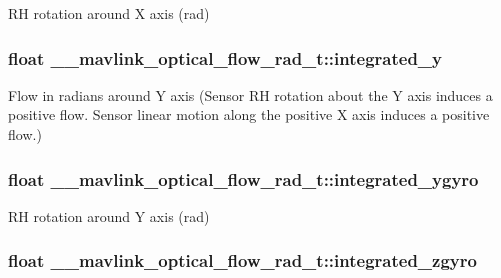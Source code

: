 R\+H rotation around X axis (rad) 

\hypertarget{struct____mavlink__optical__flow__rad__t_acc14c952d5780461cf91a5d4a7fedc89}{
\subsubsection[{integrated\+\_\+y}]{\setlength{\rightskip}{0pt plus 5cm}float \+\_\+\+\_\+mavlink\+\_\+optical\+\_\+flow\+\_\+rad\+\_\+t\+::integrated\+\_\+y}}\label{struct____mavlink__optical__flow__rad__t_acc14c952d5780461cf91a5d4a7fedc89}


Flow in radians around Y axis (Sensor R\+H rotation about the Y axis induces a positive flow. Sensor linear motion along the positive X axis induces a positive flow.) 

\hypertarget{struct____mavlink__optical__flow__rad__t_a60c6d175fc107f766d708fe407468469}{
\subsubsection[{integrated\+\_\+ygyro}]{\setlength{\rightskip}{0pt plus 5cm}float \+\_\+\+\_\+mavlink\+\_\+optical\+\_\+flow\+\_\+rad\+\_\+t\+::integrated\+\_\+ygyro}}\label{struct____mavlink__optical__flow__rad__t_a60c6d175fc107f766d708fe407468469}


R\+H rotation around Y axis (rad) 

\hypertarget{struct____mavlink__optical__flow__rad__t_a18f87c1bec8fe3e656967326437add8b}{
\subsubsection[{integrated\+\_\+zgyro}]{\setlength{\rightskip}{0pt plus 5cm}float \+\_\+\+\_\+mavlink\+\_\+optical\+\_\+flow\+\_\+rad\+\_\+t\+::integrated\+\_\+zgyro}}\label{struct____mavlink__optical__flow__rad__t_a18f87c1bec8fe3e656967326437add8b}


